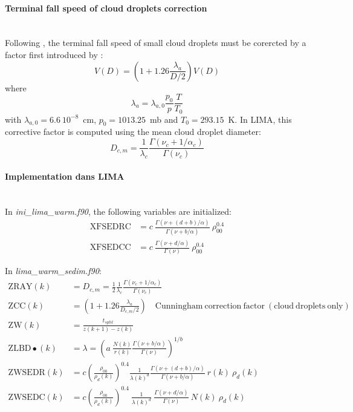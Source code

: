 {\paragraph{Terminal fall speed of cloud droplets correction}
~\\
Following \citet[][Chapter 10.3.6, Eq.\ (10-139)]{Pruppacher1997}, the terminal fall speed of small cloud droplets must be corercted by a factor first introduced by \citet{Cunningham1910}:
\begin{equation}
 V(D) = (1 + 1.26 \frac{\lambda_a}{D/2}) V(D)
\end{equation}
where
\begin{equation}
 \lambda_a = \lambda_{a,0} \frac{p_0}{p} \frac{T}{T_0}
\end{equation}
with $\lambda_{a,0} = 6.6~10^{-8}$~cm, $p_0 = 1013.25$~mb and $T_0 = 293.15$~K. In LIMA, this corrective factor is computed using the mean cloud droplet diameter:
\begin{equation}
 D_{c,m} = \frac{1}{\lambda_c} \frac{\Gamma(\nu_c + 1/\alpha_c)}{\Gamma(\nu_c)}
\end{equation}

\paragraph{Implementation dans LIMA}
~\\
In \emph{ini\_lima\_warm.f90}, the following variables are initialized:
\begin{align}
 \mathrm{XFSEDRC} &= c ~ \frac{\Gamma(\nu+(d+b)/\alpha)}{\Gamma(\nu+b/\alpha)} ~ \rho_{00}^{0.4} \\
 \mathrm{XFSEDCC} &= c ~ \frac{\Gamma(\nu+d/\alpha)}{\Gamma(\nu)} ~ \rho_{00}^{0.4}
\end{align}

In \emph{lima\_warm\_sedim.f90}:
\begin{align}
 \mathrm{ZRAY}(k) &= D_{c,m} = \frac{1}{2} \frac{1}{\lambda_c} \frac{\Gamma(\nu_c + 1/\alpha_c)}{\Gamma(\nu_c)} \\
 \mathrm{ZCC}(k) &= (1 + 1.26 \frac{\lambda_a}{D_{c,m}/2}) \quad \mathrm{Cunningham~correction~factor~(cloud~droplets~only)} \\
 \mathrm{ZW}(k) &= \frac{t_{split}}{z(k+1)-z(k)} \\
 \mathrm{ZLBD\bullet}(k) &= \lambda = \left(a ~ \frac{N(k)}{r(k)} \frac{\Gamma(\nu+b/\alpha)}{\Gamma(\nu)}\right)^{1/b} \\
 \mathrm{ZWSEDR}(k) &= c \left(\frac{\rho_{00}}{\rho_d(k)}\right)^{0.4} \frac{1}{\lambda(k)^d} \frac{\Gamma(\nu+(d+b)/\alpha)}{\Gamma(\nu+b/\alpha)} ~ r(k)  ~ \rho_d(k) \\
 \mathrm{ZWSEDC}(k) &= c \left(\frac{\rho_{00}}{\rho_d(k)}\right)^{0.4} ~ \frac{1}{\lambda(k)^d}  ~ \frac{\Gamma(\nu+d/\alpha)}{\Gamma(\nu)} ~ N(k) ~ \rho_d(k)
\end{align}

}

